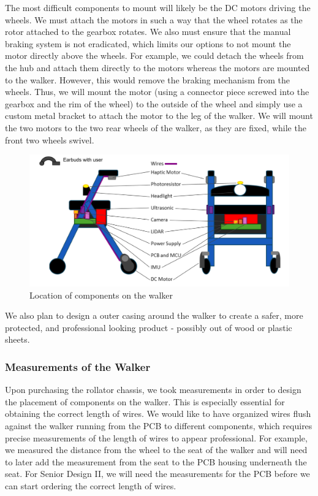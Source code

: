 \noindent The most difficult components to mount will likely be the DC motors driving the wheels. We must attach the motors in such a way that the wheel rotates as the rotor attached to the gearbox rotates. We also must ensure that the manual braking system is not eradicated, which limits our options to not mount the motor directly above the wheels. For example, we could detach the wheels from the hub and attach them directly to the motors whereas the motors are mounted to the walker. However, this would remove the braking mechanism from the wheels. Thus, we will mount the motor (using a connector piece screwed into the gearbox and the rim of the wheel) to the outside of the wheel and simply use a custom metal bracket to attach the motor to the leg of the walker. We will mount the two motors to the two rear wheels of the walker, as they are fixed, while the front two wheels swivel.\\ 

\begin{figure}[H]
	\centering
	\includegraphics[width=1\textwidth]{./Images/component_location_ear.png}
	\caption{\label{fig:Component-Locations}Location of components on the walker}
\end{figure}


\noindent We also plan to design a outer casing around the walker to create a safer, more protected, and professional looking product - possibly out of wood or plastic sheets. \\

\subsubsection{Measurements of the Walker}
\noindent Upon purchasing the rollator chassis, we took measurements in order to design the placement of components on the walker. This is especially essential for obtaining the correct length of wires. We would like to have organized wires flush against the walker running from the PCB to different components, which requires precise measurements of the length of wires to appear professional. For example, we measured the distance from the wheel to the seat of the walker and will need to later add the measurement from the seat to the PCB housing underneath the seat. For Senior Design II, we will need the measurements for the PCB before we can start ordering the correct length of wires.\\

